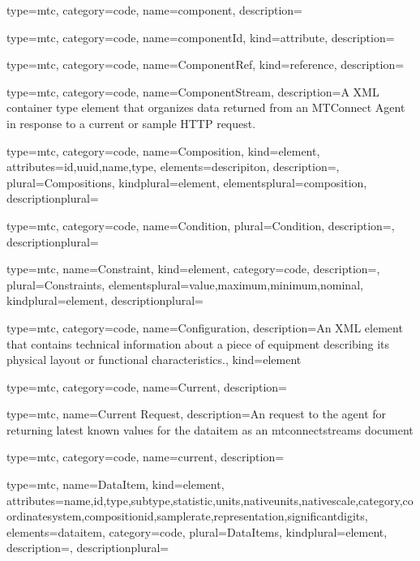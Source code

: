 {
  type=mtc,
  category=code,
  name={component},
  description={}
}


{
  type=mtc,
  category=code,
  name={componentId},
  kind={attribute},
  description={}
}


{
  type=mtc,
  category=code,
  name={ComponentRef},
  kind={reference},
  description={} 
}


{
  type=mtc,
  category=code,
  name={ComponentStream},
  description={A XML container type element that organizes data returned from an MTConnect Agent in response to a current or sample HTTP request.} 
}


{
  type=mtc,
  category=code,
  name={Composition},
  kind={element},
  attributes={\gls{id},\gls{uuid},\gls{name},\gls{type}},
  elements={\gls{descripiton}},
  description={},
  plural={Compositions},
  kindplural={element},
  elementsplural={\gls{composition}},
  descriptionplural={}
}


{
  type=mtc,
  category=code,
  name={Condition},
  plural={Condition},
  description={},
  descriptionplural={}
}


{
  type=mtc,
  name={Constraint},
  kind={element},
  category=code,
  description={},
  plural={Constraints},
  elementsplural={\gls{value},\gls{maximum},\gls{minimum},\gls{nominal}},
  kindplural={element},
  descriptionplural={}
}


{
  type=mtc,
  category=code,
  name={Configuration},
  description={An XML element that contains technical information about a piece of equipment describing its physical layout or functional characteristics.},
  kind={element}
}


{
  type=mtc,
  category=code,
  name={Current},
  description={}
}


{
  type=mtc,
  name={Current Request},
  description={An  request to the \gls{agent} for returning latest known values for the \gls{dataitem} as an \glspl{mtconnectstream}  document}
}


{
  type=mtc,
  category=code,
  name={current},
  description={}
}


{
  type=mtc,
  name={DataItem},
  kind={element},
  attributes={\gls{name},\gls{id},\gls{type},\gls{subtype},\gls{statistic},\gls{units},\gls{nativeunits},\gls{nativescale},\gls{category},\gls{coordinatesystem},\gls{compositionid},\gls{samplerate},\gls{representation},\gls{significantdigits}},
  elements={\gls{dataitem}},
  category=code,
  plural={DataItems},
  kindplural={element},
  description={},
  descriptionplural={}
}


